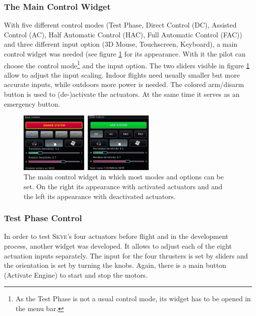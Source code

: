 \subsubsection{The Main Control Widget}
With five different control modes (Test Phase, Direct Control (DC), Assisted Control (AC), Half Automatic Control (HAC), Full Automatic Control (FAC)) and three different input option (3D Mouse, Touchscreen, Keyboard), a main control widget was needed (see figure \ref{fig:qgc_skye_control} for its appearance. With it the pilot can choose the control mode\footnote{As the Test Phase is not a usual control mode, its widget has to be opened in the menu bar.} and the input option. The two sliders visible in figure \ref{fig:qgc_skye_control} allow to adjust the input scaling. Indoor flights need usually smaller but more accurate inputs, while outdoors more power is needed. The colored arm/disarm button is used to (de-)activate the actuators. At the same time it serves as an emergency button.

\begin{figure}[H] %
	\begin{center}
		\includegraphics[width=0.6\textwidth]{qgc_skye_control}
		\caption{The main control widget in which most modes and options can be set. On the right its appearance with activated actuators and and the left its appearance with deactivated actuators.}
		\label{fig:qgc_skye_control}		
	\end{center}
\end{figure}



\subsubsection{Test Phase Control}
In order to test \textsc{Skye}'s four actuators before flight and in the development process, another widget was developed. It allows to adjust each of the eight actuation inputs separately. The input for the four thrusters is set by sliders and the orientation is set by turning the knobs. Again, there is a main button (Activate Engine) to start and stop the motors.

